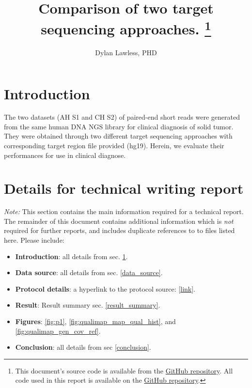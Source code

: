 \documentclass{article}
\begin{document}
\date{} %
\title{\Large \bf Comparison of two target sequencing approaches.
\footnote{This document's source code is available from the 
\href{https://github.com/DylanLawless/kit_assess}{GitHub repository}.
All code used in this report is available on the 
\href{https://github.com/DylanLawless/kit_assess}{GitHub repository}.}
}

\author[1]{\rm Dylan Lawless, PHD}
\maketitle


\section{Introduction}
\label{intro}
The two datasets (AH S1 and CH S2) of paired-end short reads were generated from the same human DNA NGS library for clinical diagnosis of solid tumor. 
They were obtained through two different target sequencing approaches with corresponding target region file provided (hg19). 
Herein, we evaluate their performances for use in clinical diagnose.

\section{Details for technical writing report}
\textit{Note:}
This section contains the main information required for a technical report.
The remainder of this document contains additional information which is \textit{not} required for further reports, and includes duplicate references to to files listed here.
Please include:

\begin{itemize}
\item \textbf{Introduction}: all details from sec. \ref{intro}.
\item \textbf{Data source}: all details from sec. \ref{data_source}.
\item \textbf{Protocol details}: a hyperlink to the protocol source: [\href{https://github.com/DylanLawless/kit_assess/README.md}{link}].
\item \textbf{Result}: Result summary sec. \ref{result_summary}.
\item \textbf{Figures}: \ref{fig:p1}, \ref{fig:qualimap_map_qual_hist},  and \ref{fig:qualimap_gen_cov_ref}.
\item \textbf{Conclusion}: all details from sec \ref{conclusion}.
\end{itemize}
\end{document}
